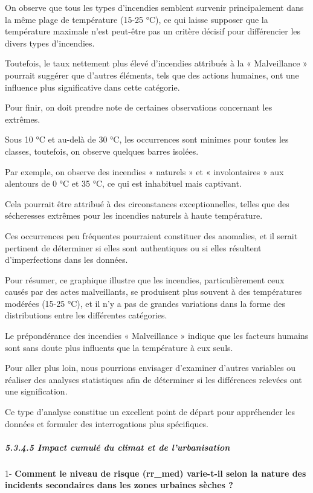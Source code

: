 \documentclass[
]{article}
\begin{document}
On observe que tous les types d'incendies semblent survenir
principalement dans la même plage de température (15-25 °C), ce qui
laisse supposer que la température maximale n'est peut-être pas un
critère décisif pour différencier les divers types d'incendies.

Toutefois, le taux nettement plus élevé d'incendies attribués à la «
Malveillance » pourrait suggérer que d'autres éléments, tels que des
actions humaines, ont une influence plus significative dans cette
catégorie.

Pour finir, on doit prendre note de certaines observations concernant
les extrêmes.

Sous 10 °C et au-delà de 30 °C, les occurrences sont minimes pour toutes
les classes, toutefois, on observe quelques barres isolées.

Par exemple, on observe des incendies « naturels » et « involontaires »
aux alentours de 0 °C et 35 °C, ce qui est inhabituel mais captivant.

Cela pourrait être attribué à des circonstances exceptionnelles, telles
que des sécheresses extrêmes pour les incendies naturels à haute
température.

Ces occurrences peu fréquentes pourraient constituer des anomalies, et
il serait pertinent de déterminer si elles sont authentiques ou si elles
résultent d'imperfections dans les données.

Pour résumer, ce graphique illustre que les incendies, particulièrement
ceux causés par des actes malveillants, se produisent plus souvent à des
températures modérées (15-25 °C), et il n'y a pas de grandes variations
dans la forme des distributions entre les différentes catégories.

Le prépondérance des incendies « Malveillance » indique que les facteurs
humains sont sans doute plus influents que la température à eux seuls.

Pour aller plus loin, nous pourrions envisager d'examiner d'autres
variables ou réaliser des analyses statistiques afin de déterminer si
les différences relevées ont une signification.

Ce type d'analyse constitue un excellent point de départ pour
appréhender les données et formuler des interrogations plus spécifiques.

\subparagraph{5.3.4.5 Impact cumulé du climat et de
l'urbanisation}\label{impact-cumuluxe9-du-climat-et-de-lurbanisation}

1- \textbf{Comment le niveau de risque (rr\_med) varie-t-il selon la
nature des incidents secondaires dans les zones urbaines sèches ?}
\end{document}
